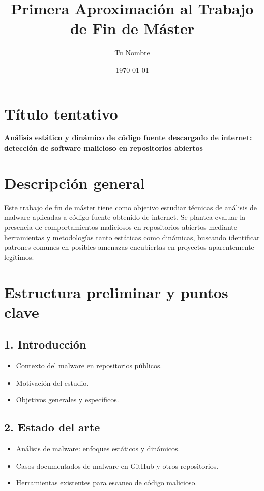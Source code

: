 \documentclass[12pt,a4paper]{article}
\title{Primera Aproximación al Trabajo de Fin de Máster}
\author{Tu Nombre}
\date{\today}
\begin{document}
\maketitle

\section*{Título tentativo}
\textbf{Análisis estático y dinámico de código fuente descargado de internet: detección de software malicioso en repositorios abiertos}

\section*{Descripción general}
Este trabajo de fin de máster tiene como objetivo estudiar técnicas de análisis de malware aplicadas a código fuente obtenido de internet. Se plantea evaluar la presencia de comportamientos maliciosos en repositorios abiertos mediante herramientas y metodologías tanto estáticas como dinámicas, buscando identificar patrones comunes en posibles amenazas encubiertas en proyectos aparentemente legítimos.

\section*{Estructura preliminar y puntos clave}

\subsection*{1. Introducción}
\begin{itemize}[label=--]
    \item Contexto del malware en repositorios públicos.
    \item Motivación del estudio.
    \item Objetivos generales y específicos.
\end{itemize}

\subsection*{2. Estado del arte}
\begin{itemize}[label=--]
    \item Análisis de malware: enfoques estáticos y dinámicos.
    \item Casos documentados de malware en GitHub y otros repositorios.
    \item Herramientas existentes para escaneo de código malicioso.
\end{itemize}
\end{document}
